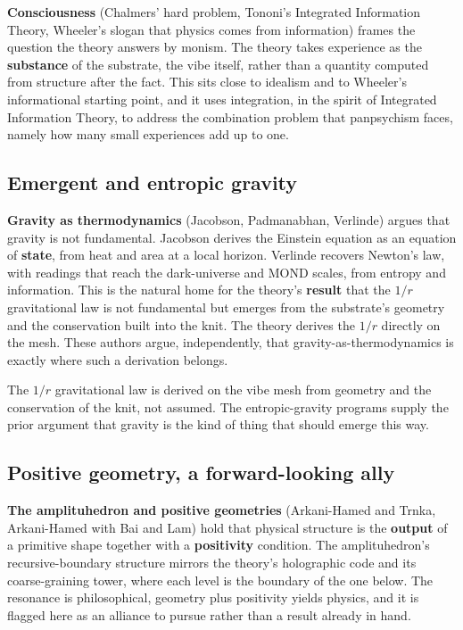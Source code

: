 \textbf{Consciousness} (Chalmers' hard problem, Tononi's Integrated Information Theory, Wheeler's slogan that physics comes from information) frames the question the theory answers by monism. The theory takes experience as the \textbf{substance} of the substrate, the vibe itself, rather than a quantity computed from structure after the fact. This sits close to idealism and to Wheeler's informational starting point, and it uses integration, in the spirit of Integrated Information Theory, to address the combination problem that panpsychism faces, namely how many small experiences add up to one.

\subsection{Emergent and entropic gravity}

\textbf{Gravity as thermodynamics} (Jacobson, Padmanabhan, Verlinde) argues that gravity is not fundamental. Jacobson derives the Einstein equation as an equation of \textbf{state}, from heat and area at a local horizon. Verlinde recovers Newton's law, with readings that reach the dark-universe and MOND scales, from entropy and information. This is the natural home for the theory's \textbf{result} that the $1/r$ gravitational law is not fundamental but emerges from the substrate's geometry and the conservation built into the knit. The theory derives the $1/r$ directly on the mesh. These authors argue, independently, that gravity-as-thermodynamics is exactly where such a derivation belongs.

\begin{result}
The $1/r$ gravitational law is derived on the vibe mesh from geometry and the conservation of the knit, not assumed. The entropic-gravity programs supply the prior argument that gravity is the kind of thing that should emerge this way.
\end{result}

\subsection{Positive geometry, a forward-looking ally}

\textbf{The amplituhedron and positive geometries} (Arkani-Hamed and Trnka, Arkani-Hamed with Bai and Lam) hold that physical structure is the \textbf{output} of a primitive shape together with a \textbf{positivity} condition. The amplituhedron's recursive-boundary structure mirrors the theory's holographic code and its coarse-graining tower, where each level is the boundary of the one below. The resonance is philosophical, geometry plus positivity yields physics, and it is flagged here as an alliance to pursue rather than a result already in hand.

